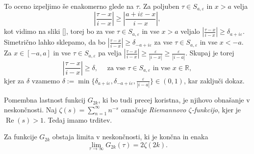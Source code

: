 \documentclass[mat1]{fmfdelo}
\numberwithin{equation}{section}
\newcommand{\R}{\mathbb R}
\newcommand{\abs}[1]{\left\lvert #1 \right\rvert}
\renewcommand\Re{\operatorname{Re}}%
\theoremstyle{definition}
\begin{document}
\begin{dokaz}
    To oceno izpeljimo še enakomerno glede na $\tau$. Za poljuben $\tau \in S_{a, \varepsilon}$ in $x > a$ velja 
    \[
        \abs{\frac{\tau - x}{i - x}} \geq \abs{\frac{a + i\varepsilon - x}{i - x}},
    \]
    kot vidimo na sliki \ref{}, torej bo za vse $\tau \in S_{a, \varepsilon}$ in vse $x > a$
    veljalo $\abs{\tfrac{\tau - x}{i - x}} \geq \delta_{a+i\varepsilon}$. Simetrično lahko sklepamo, da bo $\abs{\tfrac{\tau - x}{i - x}} \geq \delta_{-a+i\varepsilon}$ za vse $\tau \in S_{a, \varepsilon}$ in vse $x < -a$. Za $x \in [-a,a]$ in vse $\tau \in S_{a, \varepsilon}$ pa velja $\abs{\frac{\tau - x}{i - x}} \geq \frac{\varepsilon}{\abs{i - x}} \geq \frac{\varepsilon}{\abs{i - a}}$.
    Skupaj je torej 
    \[
        \abs{\frac{\tau - x}{i - x}} \geq \delta, \quad \text{ za vse } \tau \in S_{a, \varepsilon} \text{ in vse } x \in \R,
    \]
    kjer za $\delta$ vzamemo $\delta := \min\{\delta_{a + i\varepsilon}, \delta_{-a + i\varepsilon}, \frac{\varepsilon}{\abs{i - a}}\} \in (0,1)$, kar zaključi dokaz. \qedhere 
    
\end{dokaz}



Pomembna lastnost funkcij $G_{2k}$, ki bo tudi precej koristna, je njihovo obnašanje v neskončnosti. Naj $\zeta(s) = \sum_{n = 1}^\infty n^{-s}$ označuje \emph{Riemannovo $\zeta$-funkcijo}, kjer je $\Re(s) > 1$. Tedaj imamo trditev.

\begin{trditev}
    \label{G2k v neskoncnosti}
    Za funkcije $G_{2k}$ obstaja limita v neskončnosti, ki je končna in enaka 
    \[
        \lim_{\tau \to \infty}G_{2k}(\tau) = 2\zeta(2k).  
    \]
\end{trditev}
\end{document}
